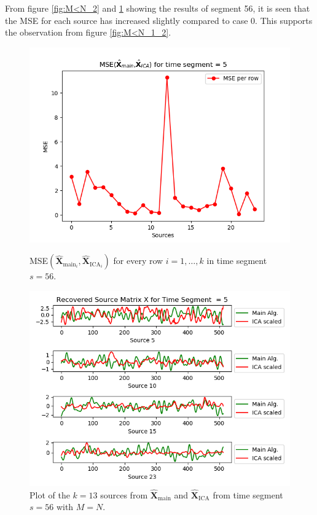 \noindent 
From figure \ref{fig:M<N_2} and \ref{fig:M<N_3} showing the results of segment 56, it is seen that the MSE for each source has increased slightly compared to case 0. 
This supports the observation from figure \ref{fig:M<N_1_2}.      
\begin{figure}[H]
\begin{widepage}
    \begin{minipage}[t]{.45\textwidth}
\centering
\includegraphics[width=1\linewidth]{figures/ch_7/resultat/mse_third_removed_ica_timeseg5.png}
\caption{MSE$\left(\hat{\mathbf{X}}_{\text{main}_{i}},\hat{\mathbf{X}}_{\text{ICA}_{i}}\right)$ for every row $i = 1, \dots, k$ in time segment $s=56$.}
\label{fig:M<N_2}
\end{minipage} 
\hspace{0.5cm}
\begin{minipage}[t]{.45\textwidth}
\centering
\includegraphics[width=1\linewidth]{figures/ch_7/resultat/EEG_third_removed_scaled_timeseg5S1_CClean.png}
\caption{Plot of the $k = 13$ sources from $\hat{\mathbf{X}}_{\text{main}}$ and $\hat{\mathbf{X}}_{\text{ICA}}$ from time segment $s = 56$ with $M = N$.}
	\label{fig:M<N_3}
    \end{minipage}
\end{widepage}
\end{figure}
